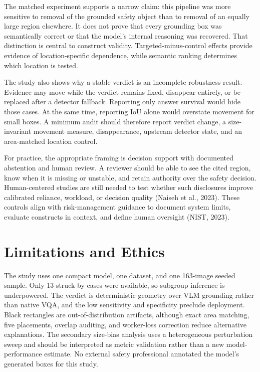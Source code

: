 \documentclass[12pt,letterpaper,twoside]{article}
\begin{document}
The matched experiment supports a narrow claim: this pipeline was more sensitive to removal of the grounded safety object than to removal of an equally large region elsewhere. It does not prove that every grounding box was semantically correct or that the model's internal reasoning was recovered. That distinction is central to construct validity. Targeted-minus-control effects provide evidence of location-specific dependence, while semantic ranking determines which location is tested.

The study also shows why a stable verdict is an incomplete robustness result. Evidence may move while the verdict remains fixed, disappear entirely, or be replaced after a detector fallback. Reporting only answer survival would hide those cases. At the same time, reporting IoU alone would overstate movement for small boxes. A minimum audit should therefore report verdict change, a size-invariant movement measure, disappearance, upstream detector state, and an area-matched location control.

For practice, the appropriate framing is decision support with documented abstention and human review. A reviewer should be able to see the cited region, know when it is missing or unstable, and retain authority over the safety decision. Human-centered studies are still needed to test whether such disclosures improve calibrated reliance, workload, or decision quality (Naiseh et al., 2023). These controls align with risk-management guidance to document system limits, evaluate constructs in context, and define human oversight (NIST, 2023).

\section{Limitations and Ethics}

The study uses one compact model, one dataset, and one 163-image seeded sample. Only 13 struck-by cases were available, so subgroup inference is underpowered. The verdict is deterministic geometry over VLM grounding rather than native VQA, and the low sensitivity and specificity preclude deployment. Black rectangles are out-of-distribution artifacts, although exact area matching, five placements, overlap auditing, and worker-loss correction reduce alternative explanations. The secondary size-bias analysis uses a heterogeneous perturbation sweep and should be interpreted as metric validation rather than a new model-performance estimate. No external safety professional annotated the model's generated boxes for this study.
\end{document}
